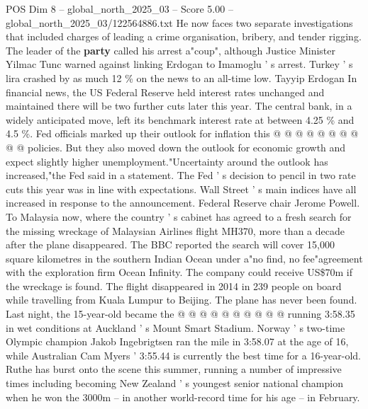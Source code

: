 \begin{textsample}{POS Dim 8 – global\_north\_2025\_03 – Score 5.00 – global\_north\_2025\_03/122564886.txt}
He now faces two separate investigations that included charges of leading a crime organisation, bribery, and tender rigging.
The leader of the \textbf{party} called his arrest a"coup", although Justice Minister Yilmac Tunc warned against linking Erdogan to Imamoglu ' s arrest.
Turkey ' s lira crashed by as much 12 \% on the news to an all-time low.
Tayyip Erdogan In financial news, the US Federal Reserve held interest rates unchanged and maintained there will be two further cuts later this year.
The central bank, in a widely anticipated move, left its benchmark interest rate at between 4.25 \% and 4.5 \%.
Fed officials marked up their outlook for inflation this @ @ @ @ @ @ @ @ @ @ policies.
But they also moved down the outlook for economic growth and expect slightly higher unemployment."Uncertainty around the outlook has increased,"the Fed said in a statement.
The Fed ' s decision to pencil in two rate cuts this year was in line with expectations.
Wall Street ' s main indices have all increased in response to the announcement.
Federal Reserve chair Jerome Powell.
To Malaysia now, where the country ' s cabinet has agreed to a fresh search for the missing wreckage of Malaysian Airlines flight MH370, more than a decade after the plane disappeared.
The BBC reported the search will cover 15,000 square kilometres in the southern Indian Ocean under a"no find, no fee"agreement with the exploration firm Ocean Infinity.
The company could receive US\$70m if the wreckage is found.
The flight disappeared in 2014 in 239 people on board while travelling from Kuala Lumpur to Beijing.
The plane has never been found.
Last night, the 15-year-old became the @ @ @ @ @ @ @ @ @ @ running 3:58.35 in wet conditions at Auckland ' s Mount Smart Stadium.
Norway ' s two-time Olympic champion Jakob Ingebrigtsen ran the mile in 3:58.07 at the age of 16, while Australian Cam Myers ' 3:55.44 is currently the best time for a 16-year-old.
Ruthe has burst onto the scene this summer, running a number of impressive times including becoming New Zealand ' s youngest senior national champion when he won the 3000m -- in another world-record time for his age -- in February.

\end{textsample}
